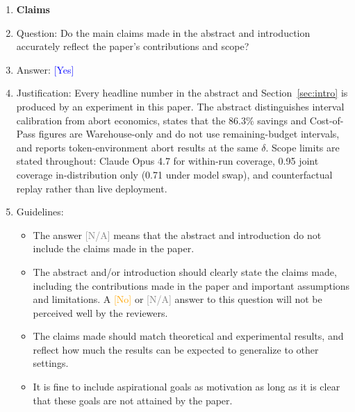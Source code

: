 \documentclass{article}
\providecommand{\answerYes}[1][]{\textcolor{blue}{[Yes] #1}}
\providecommand{\answerNo}[1][]{\textcolor{orange}{[No] #1}}
\providecommand{\answerNA}[1][]{\textcolor{gray}{[N/A] #1}}
\begin{document}
\begin{enumerate}

\item {\bf Claims}
    \item[] Question: Do the main claims made in the abstract and introduction accurately reflect the paper's contributions and scope?
    \item[] Answer: \answerYes{}
    \item[] Justification: Every headline number in the abstract and Section~\ref{sec:intro} is produced by an experiment in this paper. The abstract distinguishes interval calibration from abort economics, states that the 86.3\% savings and Cost-of-Pass figures are Warehouse-only and do not use remaining-budget intervals, and reports token-environment abort results at the same $\delta$. Scope limits are stated throughout: Claude Opus 4.7 for within-run coverage, 0.95 joint coverage in-distribution only (0.71 under model swap), and counterfactual replay rather than live deployment.
    \item[] Guidelines:
    \begin{itemize}
        \item The answer \answerNA{} means that the abstract and introduction do not include the claims made in the paper.
        \item The abstract and/or introduction should clearly state the claims made, including the contributions made in the paper and important assumptions and limitations. A \answerNo{} or \answerNA{} answer to this question will not be perceived well by the reviewers.
        \item The claims made should match theoretical and experimental results, and reflect how much the results can be expected to generalize to other settings.
        \item It is fine to include aspirational goals as motivation as long as it is clear that these goals are not attained by the paper.
    \end{itemize}


\end{enumerate}
\end{document}

